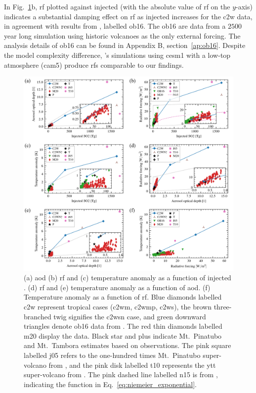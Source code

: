 \documentclass{ametsocV6.1}
\newcommand{\iso}[1][i]{{#1}njected \ce{SO2}}
\begin{document}
In Fig.~\ref{fig:4_parameter_scan}b, \gls{rf} plotted against \iso{} (with the absolute
value of \gls{rf} on the \(y\)-axis) indicates a substantial damping effect on \gls{rf}
as \iso{} increases for the \gls{c2w} data, in agreement with results from
\citet{ottobliesner2016}, labelled \gls{ob16}. The \gls{ob16} are data from a \(2500\)
year long simulation using historic volcanoes as the only external forcing. The analysis
details of \gls{ob16} can be found in Appendix B, section~\ref{ap:ob16}. Despite the
model complexity difference, \citet{ottobliesner2016}'s simulations using \gls{cesm1}
with a low-top atmosphere (\gls{cam5}) produce \glspl{rf} comparable to our findings.

\begin{figure}
  \centering
  \includegraphics[width=\linewidth]{figures/figure4.png}

  \caption{(a) \gls{aod} (b) \gls{rf} and (c) temperature anomaly as a function of
    \iso{}\@. (d) \gls{rf} and (e) temperature anomaly as a function of \gls{aod}. (f)
    Temperature anomaly as a function of \gls{rf}. Blue diamonds labelled \gls{c2w}
    represent tropical cases (\gls{c2wm}, \gls{c2wmp}, \gls{c2ws}), the brown three-branched
    twig signifies the \gls{c2wsn} case, and green downward triangles denote \gls{ob16} data
    from \citet{ottobliesner2016}. The red thin diamonds labelled \gls{m20} display the
    \citet{marshall2020dataset} data. Black star and plus indicate Mt.\ Pinatubo and Mt.\
    Tambora estimates based on observations. The pink square labelled \gls{j05} refers to
    the one-hundred times Mt.\ Pinatubo super-volcano from \citet{jones2005}, and the pink
    disk labelled \gls{t10} represents the \gls{ytt} super-volcano from
    \citet{timmreck2010}. The pink dashed line labelled \gls{n15} is from
    \citet{niemeier2015}, indicating the function in
    Eq.~\ref{eq:niemeier_exponential}.}\label{fig:4_parameter_scan}%
\end{figure}
\end{document}

